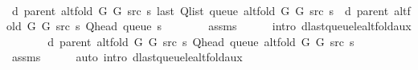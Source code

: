 \begin{isabellebody}
%
\isadelimproof
%
\endisadelimproof
%
\isatagproof
{}\isamarkupfalse%
\ {\isacharminus}{\kern0pt}\isanewline
\ \ \isamarkupfalse%
\ {\isachardoublequoteopen}d\ {\isacharparenleft}{\kern0pt}parent\ {\isacharparenleft}{\kern0pt}alt{\isacharunderscore}{\kern0pt}fold\ G{}\ G{}\ src\ s{\isacharparenright}{\kern0pt}{\isacharparenright}{\kern0pt}\ {\isacharparenleft}{\kern0pt}last\ {\isacharparenleft}{\kern0pt}Q{\isacharunderscore}{\kern0pt}list\ {\isacharparenleft}{\kern0pt}queue\ {\isacharparenleft}{\kern0pt}alt{\isacharunderscore}{\kern0pt}fold\ G{}\ G{}\ src\ s{\isacharparenright}{\kern0pt}{\isacharparenright}{\kern0pt}{\isacharparenright}{\kern0pt}{\isacharparenright}{\kern0pt}\ {\isasymle}\ d\ {\isacharparenleft}{\kern0pt}parent\ {\isacharparenleft}{\kern0pt}alt{\isacharunderscore}{\kern0pt}fold\ G{}\ G{}\ src\ s{\isacharparenright}{\kern0pt}{\isacharparenright}{\kern0pt}\ {\isacharparenleft}{\kern0pt}Q{\isacharunderscore}{\kern0pt}head\ {\isacharparenleft}{\kern0pt}queue\ s{\isacharparenright}{\kern0pt}{\isacharparenright}{\kern0pt}\ {\isacharplus}{\kern0pt}\ {}{\isachardoublequoteclose}\isanewline
\ \ \ \ \isamarkupfalse%
\ assms\isanewline
\ \ \ \ \isamarkupfalse%
\ {\isacharparenleft}{\kern0pt}intro\ d{\isacharunderscore}{\kern0pt}last{\isacharunderscore}{\kern0pt}queue{\isacharunderscore}{\kern0pt}le{\isacharunderscore}{\kern0pt}alt{\isacharunderscore}{\kern0pt}fold{\isacharunderscore}{\kern0pt}aux{\isacharparenright}{\kern0pt}\isanewline
\ \ \isamarkupfalse%
\ \isamarkupfalse%
\ {\isachardoublequoteopen}{\isachardot}{\kern0pt}{\isachardot}{\kern0pt}{\isachardot}{\kern0pt}\ {\isasymle}\ d\ {\isacharparenleft}{\kern0pt}parent\ {\isacharparenleft}{\kern0pt}alt{\isacharunderscore}{\kern0pt}fold\ G{}\ G{}\ src\ s{\isacharparenright}{\kern0pt}{\isacharparenright}{\kern0pt}\ {\isacharparenleft}{\kern0pt}Q{\isacharunderscore}{\kern0pt}head\ {\isacharparenleft}{\kern0pt}queue\ {\isacharparenleft}{\kern0pt}alt{\isacharunderscore}{\kern0pt}fold\ G{}\ G{}\ src\ s{\isacharparenright}{\kern0pt}{\isacharparenright}{\kern0pt}{\isacharparenright}{\kern0pt}\ {\isacharplus}{\kern0pt}\ {}{\isachardoublequoteclose}\isanewline
\ \ \ \ \isamarkupfalse%
\ assms\isanewline
\ \ \ \ \isamarkupfalse%
\ {\isacharparenleft}{\kern0pt}auto\ intro{\isacharcolon}{\kern0pt}\ d{\isacharunderscore}{\kern0pt}last{\isacharunderscore}{\kern0pt}queue{\isacharunderscore}{\kern0pt}le{\isacharunderscore}{\kern0pt}alt{\isacharunderscore}{\kern0pt}fold{\isacharunderscore}{\kern0pt}aux{\isacharunderscore}{\kern0pt}{}{\isacharparenright}{\kern0pt}\isanewline

\end{isabellebody}
